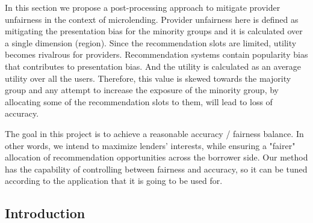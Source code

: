 \label{sec:farpfar}

In this section we propose a post-processing approach to mitigate provider unfairness in the context of microlending. Provider unfairness here is defined as mitigating the presentation bias for the minority groups and it is calculated over a single dimension (region). Since the recommendation slots are limited, utility becomes rivalrous for providers. Recommendation systems contain popularity bias that contributes to presentation bias. And the utility is calculated as an average utility over all the users. Therefore, this value is skewed towards the majority group and any attempt to increase the exposure of the minority group, by allocating some of the recommendation slots to them, will lead to loss of accuracy. 


The goal in this project is to achieve a reasonable accuracy / fairness balance. In other words, we intend to maximize lenders' interests, while ensuring a "fairer" allocation of recommendation opportunities across the borrower side. Our method has the capability of controlling between fairness and accuracy, so it can be tuned according to the application that it is going to be used for.



\subsection{Introduction}

